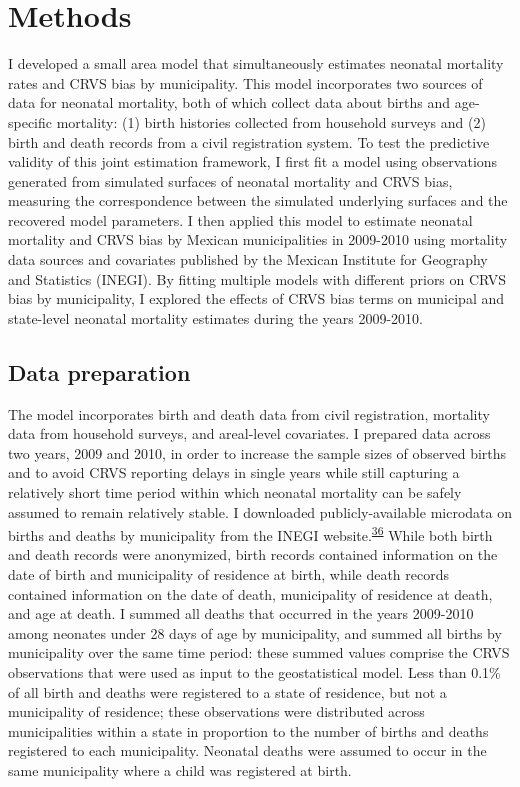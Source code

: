 \documentclass[
]{article}
\begin{document}
\hypertarget{methods}{%
\section{Methods}\label{methods}}

I developed a small area model that simultaneously estimates neonatal mortality rates and CRVS bias by municipality. This model incorporates two sources of data for neonatal mortality, both of which collect data about births and age-specific mortality: (1) birth histories collected from household surveys and (2) birth and death records from a civil registration system. To test the predictive validity of this joint estimation framework, I first fit a model using observations generated from simulated surfaces of neonatal mortality and CRVS bias, measuring the correspondence between the simulated underlying surfaces and the recovered model parameters. I then applied this model to estimate neonatal mortality and CRVS bias by Mexican municipalities in 2009-2010 using mortality data sources and covariates published by the Mexican Institute for Geography and Statistics (INEGI). By fitting multiple models with different priors on CRVS bias by municipality, I explored the effects of CRVS bias terms on municipal and state-level neonatal mortality estimates during the years 2009-2010.

\hypertarget{data-preparation}{%
\subsection{Data preparation}\label{data-preparation}}

The model incorporates birth and death data from civil registration, mortality data from household surveys, and areal-level covariates. I prepared data across two years, 2009 and 2010, in order to increase the sample sizes of observed births and to avoid CRVS reporting delays in single years while still capturing a relatively short time period within which neonatal mortality can be safely assumed to remain relatively stable. I downloaded publicly-available microdata on births and deaths by municipality from the INEGI website.\textsuperscript{\protect\hyperlink{ref-INEGI2010}{36}} While both birth and death records were anonymized, birth records contained information on the date of birth and municipality of residence at birth, while death records contained information on the date of death, municipality of residence at death, and age at death. I summed all deaths that occurred in the years 2009-2010 among neonates under 28 days of age by municipality, and summed all births by municipality over the same time period: these summed values comprise the CRVS observations that were used as input to the geostatistical model. Less than 0.1\% of all birth and deaths were registered to a state of residence, but not a municipality of residence; these observations were distributed across municipalities within a state in proportion to the number of births and deaths registered to each municipality. Neonatal deaths were assumed to occur in the same municipality where a child was registered at birth.
\end{document}
